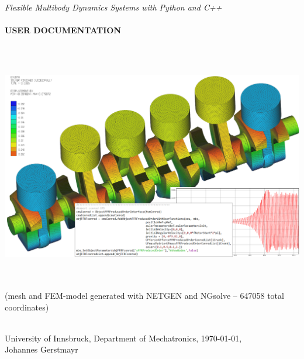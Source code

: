 \documentclass[11pt,a4paper]{book} %
\begin{document}
\setcounter{page}{0}
\pagestyle{empty}

\begin{center}
{\Large {\it Flexible Multibody Dynamics Systems with Python and C++}}\vspace{1cm}\\
{\Huge {\bf \codeName}} \vspace{0.5cm}\\
{\Large \bf USER DOCUMENTATION} \vspace{1cm}\\
\vspace{0.2cm}
\begin{center}
	\includegraphics[height=11cm]{intro2.png}\\
	{\tiny (mesh and FEM-model generated with NETGEN and NGsolve -- 647058 total coordinates)}
\end{center}
\vspace{0.2cm}
{\small }\\
\vspace{1.5cm}
University of Innsbruck, Department of Mechatronics, \today,\vspace{0.25cm}\\
Johannes Gerstmayr\vspace{2cm}
\end{center}
\end{document}
